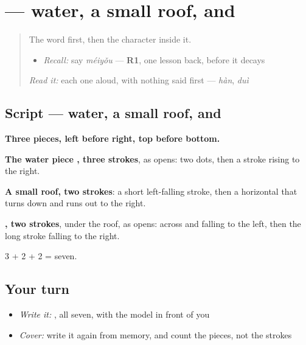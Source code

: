 \section[\texorpdfstring{\zh{没} (méi)}{没 (méi)}]{ — water, a small roof, and }

\label{lesson:ZH-W87-mei}



\begin{quote}
The word first, then the character inside it.

\begin{itemize}
\raggedright
  \item \emph{Recall:} say \emph{méiyǒu} — \textbf{R1}, one lesson back, before it decays
\end{itemize}

\begin{quote}
 
\end{quote}

\emph{Read it:} each one aloud, with nothing said first — \emph{hàn}, \emph{duì}
\end{quote}

\subsection*{Script — water, a small roof, and }

\begin{quote}
\end{quote}

\textbf{Three pieces, left before right, top before bottom.}

\textbf{The water piece , three strokes}, as  opens: two dots, then a stroke rising to the right.

\textbf{A small roof, two strokes}: a short left-falling stroke, then a horizontal that turns down and runs out to the right.

\textbf{, two strokes}, under the roof, as  opens: across and falling to the left, then the long stroke falling to the right.

3 + 2 + 2 = seven.

\subsection*{Your turn}
\begin{itemize}
\raggedright
  \item \emph{Write it:} , all seven, with the model in front of you
  \item \emph{Cover:} write it again from memory, and count the pieces, not the strokes
\end{itemize}

